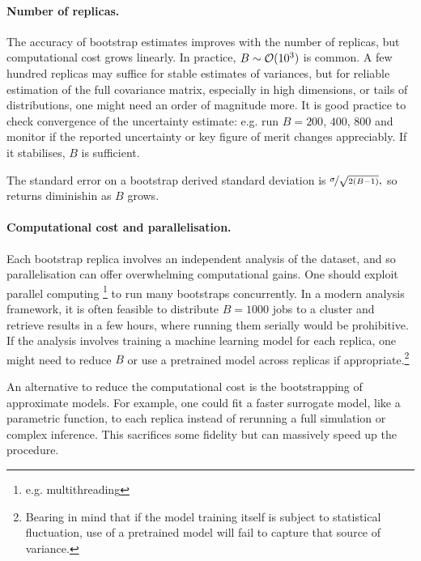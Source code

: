         \paragraph{Number of replicas.}
            The accuracy of bootstrap estimates improves with the number of replicas, but computational cost grows linearly.
            In practice, $B\sim{\mathcal O}(\num{d3})$ is common.
            A few hundred replicas may suffice for stable estimates of variances, but for reliable estimation of the full covariance matrix, especially in high dimensions, or tails of distributions, one might need an order of magnitude more.
            It is good practice to check convergence of the uncertainty estimate: e.g. run $B=200$, $400$, $800$ and monitor if the reported uncertainty or key figure of merit changes appreciably.
            If it stabilises, $B$ is sufficient.
            
            The standard error on a bootstrap derived standard deviation is $\nicefrac{\sigma}{\sqrt{2(B-1)}},$ so returns diminishin as $B$ grows.
        \paragraph{Computational cost and parallelisation.}
            Each bootstrap replica involves an independent analysis of the dataset, and so parallelisation can offer overwhelming computational gains.
            One should exploit parallel computing \footnote{e.g. multithreading} to run many bootstraps concurrently.
            In a modern analysis framework, it is often feasible to distribute $B=1000$ jobs to a cluster and retrieve results in a few hours, where running them serially would be prohibitive.
            If the analysis involves training a machine learning model for each replica, one might need to reduce $B$ or use a pretrained model across replicas if appropriate.\footnote{Bearing in mind that if the model training itself is subject to statistical fluctuation, use of a pretrained model will fail to capture that source of variance.}
            
            An alternative to reduce the computational cost is the bootstrapping of approximate models.
            For example, one could fit a faster surrogate model, like a parametric function, to each replica instead of rerunning a full simulation or complex inference.
            This sacrifices some fidelity but can massively speed up the procedure.
